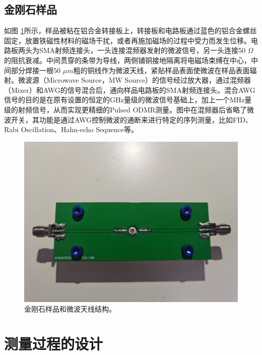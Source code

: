 \documentclass[type = bachelor, oneside]{whu-thesis}
\begin{document}
\subsection{金刚石样品}
如图 \ref{fig: Sample}所示，样品被粘在铝合金转接板上，转接板和电路板通过蓝色的铝合金螺丝固定，放置铁磁性材料的磁场干扰，或者再施加磁场的过程中受力而发生位移。电路板两头为SMA射频连接头，一头连接混频器发射的微波信号，另一头连接50 $\Omega$的阻抗衰减。中间贯穿的条带为导线，两侧铺铜接地隔离将电磁场束缚在中心，中间部分焊接一根50 $\mu m$粗的铜线作为微波天线，紧贴样品表面使微波在样品表面辐射。微波源（Microwave Source，MW Source）的信号经过放大器，通过混频器（Mixer）和AWG的信号混合后，通向样品电路板的SMA射频连接头。混合AWG信号的目的是在原有设置的恒定的GHz量级的微波信号基础上，加上一个MHz量级的射频信号，从而实现更精细的Pulsed ODMR测量。图中在混频器后省略了微波开关，其功能是通过AWG控制微波的通断来进行特定的序列测量，比如FID、Rabi Oscillation、Hahn-echo Sequence等。
\begin{figure}
  \centering
  \includegraphics[width=1.0\textwidth]{figures/Chapter 2/Sample.jpg}
  \caption[金刚石样品和微波天线结构]{金刚石样品和微波天线结构。}
  \label{fig: Sample}
\end{figure}

\section{测量过程的设计}
\end{document}
